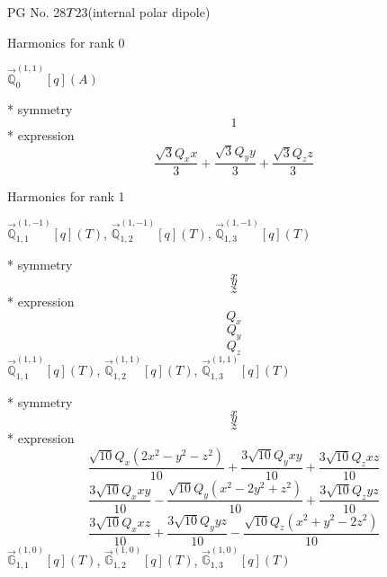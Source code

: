 \documentclass[fleqn,8pt]{jsarticle}
\begin{document}
\setcounter{MaxMatrixCols}{32}

\renewcommand{\tablename}{Table~}
\renewcommand{\figurename}{Figure~}
\begin{center}
\LARGE
PG No. 28\quad$T_{\rm }$\quad$23$\quad[ cubic ] (internal polar dipole)
\end{center}

\noindent * Harmonics for rank 0

\noindent\quad $\vec{\mathbb{Q}}_{0}^{(1,1)}[q](A)$

\noindent\quad ** symmetry
\begin{dmath*}
1
\end{dmath*}
\noindent\quad ** expression
\begin{dmath*}
\frac{\sqrt{3} Q_{x} x}{3} + \frac{\sqrt{3} Q_{y} y}{3} + \frac{\sqrt{3} Q_{z} z}{3}
\end{dmath*}

\noindent * Harmonics for rank 1

\noindent\quad $\vec{\mathbb{Q}}_{1,1}^{(1,-1)}[q](T)$, $\vec{\mathbb{Q}}_{1,2}^{(1,-1)}[q](T)$, $\vec{\mathbb{Q}}_{1,3}^{(1,-1)}[q](T)$

\noindent\quad ** symmetry
\begin{dmath*}
x
\end{dmath*}
\begin{dmath*}
y
\end{dmath*}
\begin{dmath*}
z
\end{dmath*}
\noindent\quad ** expression
\begin{dmath*}
Q_{x}
\end{dmath*}
\begin{dmath*}
Q_{y}
\end{dmath*}
\begin{dmath*}
Q_{z}
\end{dmath*}
\noindent\quad $\vec{\mathbb{Q}}_{1,1}^{(1,1)}[q](T)$, $\vec{\mathbb{Q}}_{1,2}^{(1,1)}[q](T)$, $\vec{\mathbb{Q}}_{1,3}^{(1,1)}[q](T)$

\noindent\quad ** symmetry
\begin{dmath*}
x
\end{dmath*}
\begin{dmath*}
y
\end{dmath*}
\begin{dmath*}
z
\end{dmath*}
\noindent\quad ** expression
\begin{dmath*}
\frac{\sqrt{10} Q_{x} \left(2 x^{2} - y^{2} - z^{2}\right)}{10} + \frac{3 \sqrt{10} Q_{y} x y}{10} + \frac{3 \sqrt{10} Q_{z} x z}{10}
\end{dmath*}
\begin{dmath*}
\frac{3 \sqrt{10} Q_{x} x y}{10} - \frac{\sqrt{10} Q_{y} \left(x^{2} - 2 y^{2} + z^{2}\right)}{10} + \frac{3 \sqrt{10} Q_{z} y z}{10}
\end{dmath*}
\begin{dmath*}
\frac{3 \sqrt{10} Q_{x} x z}{10} + \frac{3 \sqrt{10} Q_{y} y z}{10} - \frac{\sqrt{10} Q_{z} \left(x^{2} + y^{2} - 2 z^{2}\right)}{10}
\end{dmath*}
\noindent\quad $\vec{\mathbb{G}}_{1,1}^{(1,0)}[q](T)$, $\vec{\mathbb{G}}_{1,2}^{(1,0)}[q](T)$, $\vec{\mathbb{G}}_{1,3}^{(1,0)}[q](T)$
\end{document}
